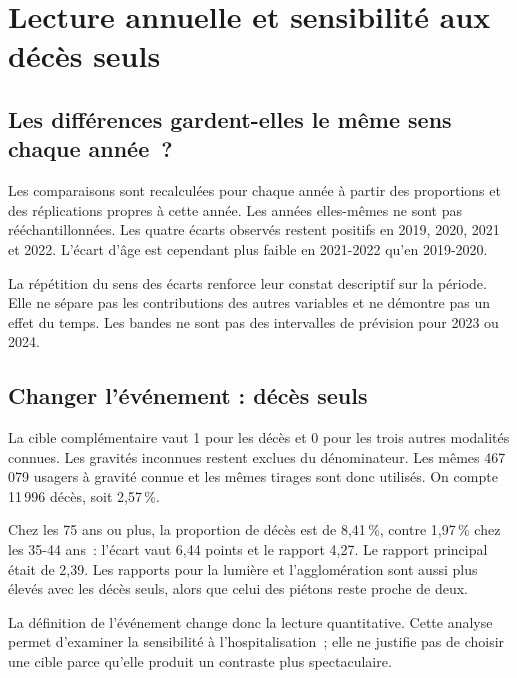 \clearpage
\section{Lecture annuelle et sensibilité aux décès seuls}
\subsection{Les différences gardent-elles le même sens chaque année~?}
Les comparaisons sont recalculées pour chaque année à partir des proportions et des
réplications propres à cette année. Les années elles-mêmes ne sont pas rééchantillonnées.
Les quatre écarts observés restent positifs en 2019, 2020, 2021 et 2022. L'écart d'âge
est cependant plus faible en 2021-2022 qu'en 2019-2020.

La répétition du sens des écarts renforce leur constat descriptif sur la période.
Elle ne sépare pas les contributions des autres variables et ne démontre pas un effet
du temps. Les bandes ne sont pas des intervalles de prévision pour 2023 ou 2024.
\FloatBarrier

\subsection{Changer l'événement : décès seuls}
La cible complémentaire vaut 1 pour les décès et 0 pour les trois autres modalités
connues. Les gravités inconnues restent exclues du dénominateur. Les mêmes 467\,079
usagers à gravité connue et les mêmes tirages sont donc utilisés. On compte
11\,996 décès, soit 2,57\,\%.

\FloatBarrier

Chez les 75 ans ou plus, la proportion de décès est de 8,41\,\%, contre 1,97\,\% chez
les 35-44 ans~: l'écart vaut 6,44 points et le rapport 4,27. Le rapport principal
était de 2,39. Les rapports pour la lumière et l'agglomération sont aussi plus élevés
avec les décès seuls, alors que celui des piétons reste proche de deux.

La définition de l'événement change donc la lecture quantitative. Cette analyse
permet d'examiner la sensibilité à l'hospitalisation~; elle ne justifie pas de choisir
une cible parce qu'elle produit un contraste plus spectaculaire.
\FloatBarrier

